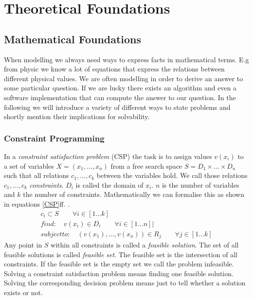 \chapter{Theoretical Foundations}
\section{Mathematical Foundations}
When modelling we always need ways to express facts in mathematical terms. E.g from physic we know a lot of equations that express the relations between different physical values. We are often modelling in order to derive an answer to some particular question. If we are lucky there exists an algorithm and even a software implementation that can compute the answer to our question. In the following we will introduce a variety of different ways to state problems and shortly mention their implications for solvability.
\subsection{Constraint Programming}
In a \emph{constraint satisfaction problem} (CSP) the task is to assign values $v(x_i)$ to a set of variables $X = (x_1, \dots , x_n)$ from a free search space $S=D_1\times \dots \times D_n$ such that all relations $c_1,\dots,c_k$ between the variables hold. We call those relations $c_1,\dots,c_k$ \emph{constraints}. $D_i$ is called the domain of $x_i$. $n$ is the number of variables and $k$ the number of constraints.  Mathematically we can formalise this as shown in equations \ref{CSP}ff. \cite{Eiben97constraintsatisfaction}\cite{wiki:CSP}.
\begin{eqnarray} 
\label{CSP}
c_i \subset S \qquad\forall i \in \left[ 1 \dots k \right]\\
find: \quad v(x_i) \in D_i \qquad\forall i \in \left[ 1 \dots n \right]| \\
subject to: \quad (v(x_1),\dots , v(x_n)) \in R_j\qquad\forall j \in \left[1 \dots k\right]
\end{eqnarray} 
Any point in $S$ within all constraints is called a \emph{feasible solution}. The set of all feasible solutions is called \emph{feasible set}. The feasible set is the intersection of all constraints. If the feasible set is the empty set we call the problem infeasible. Solving a constraint satisfaction problem means finding one feasible solution. Solving the corresponding decision problem means just to tell whether a solution exists or not. \\

